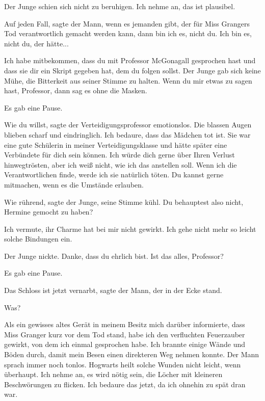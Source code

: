 Der Junge schien sich nicht zu beruhigen. \glqq{}Ich nehme an, das ist
plausibel.\grqq{}

\glqq{}Auf jeden Fall\grqq{}, sagte der Mann, \glqq{}wenn es jemanden gibt, der
für Miss Grangers Tod verantwortlich gemacht werden kann, dann bin ich es, nicht
du. Ich bin es, nicht du, der hätte...\grqq{}

\glqq{}Ich habe mitbekommen, dass du mit Professor McGonagall gesprochen hast und
dass sie dir ein Skript gegeben hat, dem du folgen sollst.\grqq{} Der Junge gab
sich keine Mühe, die Bitterkeit aus seiner Stimme zu halten. \glqq{}Wenn du mir
etwas zu sagen hast, Professor, dann sag es ohne die Masken.\grqq{}

Es gab eine Pause.

\glqq{}Wie du willst\grqq{}, sagte der Verteidigungsprofessor emotionslos. Die
blassen Augen blieben scharf und eindringlich. \glqq{}Ich bedaure, dass das
Mädchen tot ist. Sie war eine gute Schülerin in meiner Verteidigungsklasse und
hätte später eine Verbündete für dich sein können. Ich würde dich gerne über
Ihren Verlust hinwegtrösten, aber ich weiß nicht, wie ich das anstellen soll.
Wenn ich die Verantwortlichen finde, werde ich sie natürlich töten. Du kannst
gerne mitmachen, wenn es die Umstände erlauben.\grqq{}

\glqq{}Wie rührend\grqq{}, sagte der Junge, seine Stimme kühl. \glqq{}Du
behauptest also nicht, Hermine gemocht zu haben?\grqq{}

\glqq{}Ich vermute, ihr Charme hat bei mir nicht gewirkt. Ich gehe nicht mehr so
leicht solche Bindungen ein.\grqq{}

Der Junge nickte. \glqq{}Danke, dass du ehrlich bist. Ist das alles,
Professor?\grqq{}

Es gab eine Pause.

\glqq{}Das Schloss ist jetzt vernarbt\grqq{}, sagte der Mann, der in der Ecke
stand.

\glqq{}Was?\grqq{}

\glqq{}Als ein gewisses altes Gerät in meinem Besitz mich darüber informierte,
dass Miss Granger kurz vor dem Tod stand, habe ich den verfluchten Feuerzauber
gewirkt, von dem ich einmal gesprochen habe. Ich brannte einige Wände und Böden
durch, damit mein Besen einen direkteren Weg nehmen konnte.\grqq{} Der Mann
sprach immer noch tonlos. \glqq{}Hogwarts heilt solche Wunden nicht leicht, wenn
überhaupt. Ich nehme an, es wird nötig sein, die Löcher mit kleineren
Beschwörungen zu flicken. Ich bedaure das jetzt, da ich ohnehin zu spät dran
war.\grqq{}

